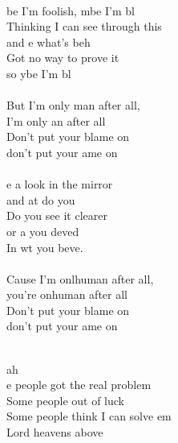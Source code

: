 \begin{cancion}%
	  \\
	be I'm foolish, mbe I'm bl\\
Thinking I can see through this \\
	and e what's beh\\
Got no way to prove it \\
	so ybe I'm bl  \\
\jump\\
	But I'm only man after all, \\
	I'm only an after all\\
	Don't put your blame on  \\
	don't put your ame on   \\
\jump\\
	e a look in the mirror \\
	and at do you \\
Do you see it clearer \\
	or a you deved\\
	In wt you beve.  \\
\jump\\
	Cause I'm onlhuman after all, \\
	you're onhuman after all\\
	Don't put your blame on  \\
	don't put your ame on \\\jump\\
	\begin{chorus}%
	ah\\
	e people got the real problem \\
	Some people out of luck \\
	Some people think I can solve em\\
Lord heavens above\\
\jump\\

\end{chorus}
\end{cancion}

